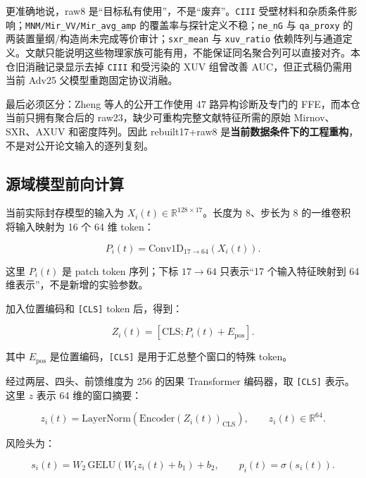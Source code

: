 \documentclass[11pt,a4paper]{article}
\newcommand{\code}[1]{\texttt{\small #1}}
\begin{document}
更准确地说，raw8 是“目标私有使用”，不是“废弃”。\code{CIII} 受壁材料和杂质条件影响；\code{MNM/Mir\_VV/Mir\_avg\_amp} 的覆盖率与探针定义不稳；\code{ne\_nG} 与 \code{qa\_proxy} 的两装置量纲/构造尚未完成等价审计；\code{sxr\_mean} 与 \code{xuv\_ratio} 依赖阵列与通道定义。文献只能说明这些物理家族可能有用，不能保证同名聚合列可以直接对齐。本仓旧消融记录显示去掉 \code{CIII} 和受污染的 XUV 组曾改善 AUC，但正式稿仍需用当前 Adv25 父模型重跑固定协议消融。

最后必须区分：Zheng 等人的公开工作使用 47 路异构诊断及专门的 FFE，而本仓当前只拥有聚合后的 raw23，缺少可重构完整文献特征所需的原始 Mirnov、SXR、AXUV 和密度阵列。因此 rebuilt17+raw8 是\textbf{当前数据条件下的工程重构}，不是对公开论文输入的逐列复刻。

\subsection{源域模型前向计算}

当前实际封存模型的输入为 \(X_i(t)\in\mathbb{R}^{128\times17}\)。长度为 8、步长为 8 的一维卷积将输入映射为 16 个 64 维 token：

\begin{equation}
P_i(t)=\mathrm{Conv1D}_{17\rightarrow64}\!\left(X_i(t)\right).
\label{eq:patch}
\end{equation}

这里 \(P_i(t)\) 是 patch token 序列；下标 \(17\rightarrow64\) 只表示“17 个输入特征映射到 64 维表示”，不是新增的实验参数。

加入位置编码和 \code{[CLS]} token 后，得到：

\begin{equation}
Z_i(t)=\left[\mathrm{CLS};P_i(t)+E_{\mathrm{pos}}\right].
\label{eq:tokens}
\end{equation}

其中 \(E_{\mathrm{pos}}\) 是位置编码，\code{[CLS]} 是用于汇总整个窗口的特殊 token。

经过两层、四头、前馈维度为 256 的因果 Transformer 编码器，取 \code{[CLS]} 表示。这里 \(z\) 表示 64 维的窗口摘要：

\begin{equation}
z_i(t)=\mathrm{LayerNorm}\!\left(
\mathrm{Encoder}(Z_i(t))_{\mathrm{CLS}}\right),
\qquad z_i(t)\in\mathbb{R}^{64}.
\label{eq:encoder}
\end{equation}

风险头为：

\begin{equation}
s_i(t)=W_2\,\mathrm{GELU}(W_1z_i(t)+b_1)+b_2,
\qquad p_i(t)=\sigma(s_i(t)).
\label{eq:risk-head}
\end{equation}
\end{document}
